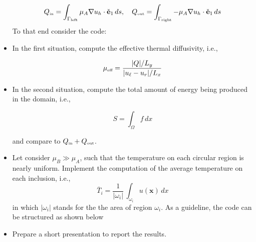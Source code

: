 \begin{kaobox}[frametitle=Implement the following modifications to \texttt{inclusions\_poisson.py}]
\begin{itemize}
 \begin{equation}
 Q_{\mbox{\tiny in}} = \int_{ \Gamma_{\mbox{\tiny left}}}{\mu_A \nabla{u}_h \cdot \check{\mathbf{e}}_1}\,ds,~~~
 Q_{\mbox{\tiny out}} = \int_{ \Gamma_{\mbox{\tiny right}}}{-\mu_A \nabla{u}_h \cdot \check{\mathbf{e}}_1}\,ds
 \nonumber
 \end{equation}
 To that end consider the code:
\begin{center}
\vspace{-0.35cm}
\begin{minipage}{0.925\textwidth}
    
\end{minipage}
\end{center}

\item In the first situation, compute the effective thermal diffusivity, i.e.,

\begin{equation}
\mu_{\mbox{\tiny eff}} = \frac{|Q|/L_y}{|u_{\ell} - u_r|/L_x}  \nonumber
\end{equation}
\item In the second situation, compute the total amount of energy being produced in the domain, i.e.,

\begin{equation}
S = \int_{\Omega}{f\,d{x}}  \nonumber
\end{equation}

and compare to $Q_{\mbox{\tiny in}} + Q_{\mbox{\tiny out}}$.\\
 
 \item Let consider $\mu_B \gg \mu_A$, such that the temperature
 on each circular region is nearly uniform. Implement the computation of 
 the average temperature on each inclusion, i.e., 
 \begin{equation}
 \bar{T}_i = \frac{1}{|\omega_i|} \, \int_{\omega_i}{u(\mathbf{x})}\,d{x} \nonumber
 \end{equation}
 in which $|\omega_i|$ stands for the the area of region $\omega_i$.
 As a guideline, the code can be structured as shown below
\begin{center}
\vspace{-0.05cm}
\begin{minipage}{0.85\textwidth}
    
\end{minipage}
\end{center}

\item Prepare a short presentation to report the results.

\end{itemize}

\end{kaobox}

